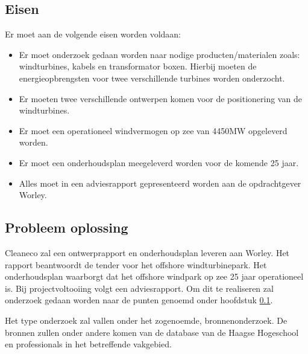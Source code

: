 \subsection{Eisen} \label{Eisen}
Er moet aan de volgende eisen worden voldaan:
\begin{itemize}
   \item Er moet onderzoek gedaan worden naar nodige producten/materialen zoals: windturbines, kabels en transformator boxen. Hierbij moeten de energieopbrengsten voor twee verschillende turbines worden onderzocht.
   \item Er moeten twee verschillende ontwerpen komen voor de positionering van de windturbines. 
   \item Er moet een operationeel windvermogen op zee van 4450MW opgeleverd worden.
   \item Er moet een onderhoudsplan meegeleverd worden voor de komende 25 jaar.
   \item Alles moet in een adviesrapport gepresenteerd worden aan de opdrachtgever Worley.
 \end{itemize}

\subsection{Probleem oplossing}
Cleaneco zal een ontwerprapport en onderhoudsplan leveren aan Worley. Het rapport beantwoordt de \gls{tender} voor het \gls{offshore} windturbinepark. Het onderhoudsplan waarborgt dat het \gls{offshore} windpark op zee 25 jaar operationeel is. Bij projectvoltooiing volgt een adviesrapport. Om dit te realiseren zal onderzoek gedaan worden naar de punten genoemd onder hoofdstuk \ref{Eisen}. 

Het type onderzoek zal vallen onder het zogenoemde, bronnenonderzoek. De bronnen zullen onder andere komen van de database van de Haagse Hogeschool en professionals in het betreffende vakgebied.
